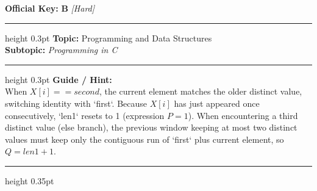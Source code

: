 \documentclass[a4paper,10pt]{article}
\begin{document}
\begin{tcolorbox}
\textbf{Official Key:} \textbf{\large B} \hfill \textit{\small [Hard]}
\vspace{2pt}\hrule height 0.3pt\vspace{3pt}
\textbf{Topic:} Programming and Data Structures \\
\textbf{Subtopic:} \textit{Programming in C}
\vspace{2pt}\hrule height 0.3pt\vspace{3pt}
\textbf{Guide / Hint:} \\
{\small When $X[i] == second$, the current element matches the older distinct value, switching identity with `first`. Because $X[i]$ has just appeared once consecutively, `len1` resets to 1 (expression $P = 1$). When encountering a third distinct value (else branch), the previous window keeping at most two distinct values must keep only the contiguous run of `first` plus current element, so $Q = len1 + 1$.}

\end{tcolorbox}
\vspace{6pt}\hrule height 0.35pt\vspace{6pt}
\noindent
\end{document}
